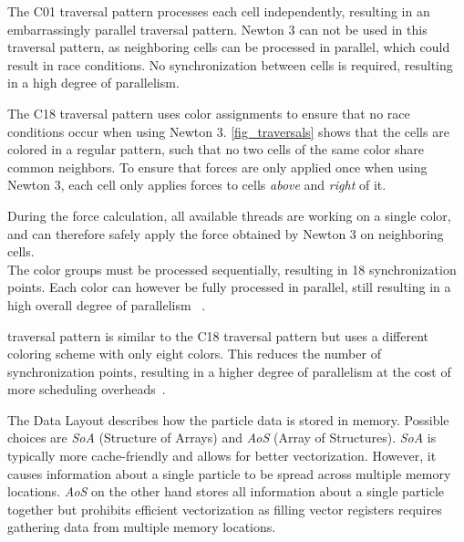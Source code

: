 \documentclass[conference]{IEEEtran}
\begin{document}
\begin{description}[style=nextline]
        \begin{description}[style=nextline, font=\itshape\mdseries]
            \item[C01]
                The C01 traversal pattern processes each cell independently, resulting in an embarrassingly parallel traversal pattern. Newton 3 can not be used in this traversal pattern, as neighboring cells can be processed in parallel, which could result in race conditions. No synchronization between cells is required, resulting in a high degree of parallelism.
            \item[C18]
                The C18 traversal pattern uses color assignments to ensure that no race conditions occur when using Newton 3. \autoref{fig_traversals} shows that the cells are colored in a regular pattern, such that no two cells of the same color share common neighbors. To ensure that forces are only applied once when using Newton 3, each cell only applies forces to cells \textit{above} and \textit{right} of it.

                During the force calculation, all available threads are working on a single color, and can therefore safely apply the force obtained by Newton 3 on neighboring cells. \\
                The color groups must be processed sequentially, resulting in 18 synchronization points. Each color can however be fully processed in parallel, still resulting in a high overall degree of parallelism ~\cite{NEWCOME2023115278}.
            \item[C08]
                traversal pattern is similar to the C18 traversal pattern but uses a different coloring scheme with only eight colors. This reduces the number of synchronization points, resulting in a higher degree of parallelism at the cost of more scheduling overheads~\cite{NEWCOME2023115278}.
        \end{description}

    \item[Data Layout]
        The Data Layout describes how the particle data is stored in memory. Possible choices are \textit{SoA} (Structure of Arrays) and \textit{AoS} (Array of Structures). \textit{SoA} is typically more cache-friendly and allows for better vectorization. However, it causes information about a single particle to be spread across multiple memory locations. \textit{AoS} on the other hand stores all information about a single particle together but prohibits efficient vectorization as filling vector registers requires gathering data from multiple memory locations.
\end{description}
\end{document}
